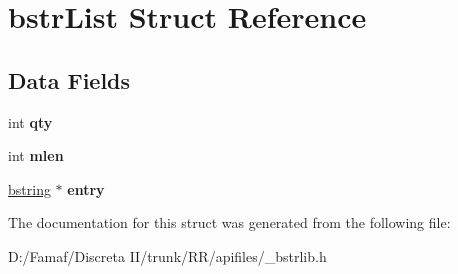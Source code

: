 \hypertarget{structbstr_list}{\section{bstr\+List Struct Reference}
\label{structbstr_list}
}
\subsection*{Data Fields}
\begin{DoxyCompactItemize}
\item 
\hypertarget{structbstr_list_ad4909b55bdea3ec89ab08ca94cc6e4f3}{int {\bfseries qty}}\label{structbstr_list_ad4909b55bdea3ec89ab08ca94cc6e4f3}

\item 
\hypertarget{structbstr_list_a9c4822dec37f1e532c6a73ddf66866d2}{int {\bfseries mlen}}\label{structbstr_list_a9c4822dec37f1e532c6a73ddf66866d2}

\item 
\hypertarget{structbstr_list_a6309c930e648c1e1e797c3456240789d}{\hyperlink{structtagbstring}{bstring} $\ast$ {\bfseries entry}}\label{structbstr_list_a6309c930e648c1e1e797c3456240789d}

\end{DoxyCompactItemize}


The documentation for this struct was generated from the following file\+:\begin{DoxyCompactItemize}
\item 
D\+:/\+Famaf/\+Discreta I\+I/trunk/\+R\+R/apifiles/\+\_\+bstrlib.\+h\end{DoxyCompactItemize}
